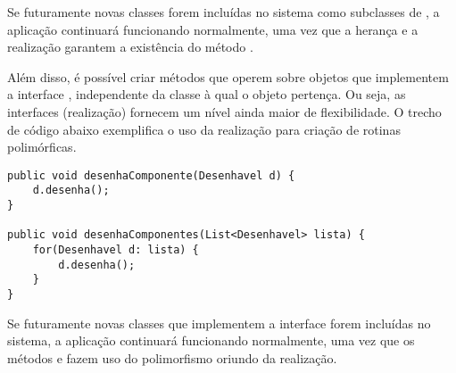 Se futuramente novas classes forem incluídas no sistema como subclasses de , a aplicação continuará funcionando normalmente, uma vez que a herança e a realização garantem a existência do método .

Além disso, é possível criar métodos que operem sobre objetos que implementem a interface , independente da classe à qual o objeto pertença. Ou seja, as interfaces (realização) fornecem um nível ainda maior de flexibilidade. O trecho de código abaixo exemplifica o uso da realização para criação de rotinas polimórficas.

\begin{verbatim}
public void desenhaComponente(Desenhavel d) {
	d.desenha();
}

public void desenhaComponentes(List<Desenhavel> lista) {
	for(Desenhavel d: lista) {
		d.desenha();
	}
}
\end{verbatim}

Se futuramente novas classes que implementem a interface  forem incluídas no sistema, a aplicação continuará funcionando normalmente, uma vez que os métodos  e  fazem uso do polimorfismo oriundo da realização.
 
 
